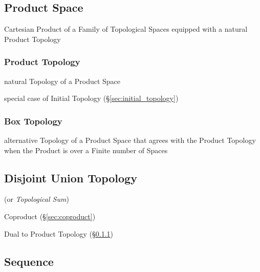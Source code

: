 \subsection{Product Space}\label{sec:product_space}

Cartesian Product of a Family of Topological Spaces equipped with a natural
Product Topology



\subsubsection{Product Topology}\label{sec:product_topology}

natural Topology of a Product Space

special case of Initial Topology (\S\ref{sec:initial_topology})



\subsubsection{Box Topology}\label{sec:box_topology}

alternative Topology of a Product Space that agrees with the Product Topology
when the Product is over a Finite number of Spaces



\subsection{Disjoint Union Topology}\label{sec:disjoint_union_topology}

(or \emph{Topological Sum})

Coproduct (\S\ref{sec:coproduct})

Dual to Product Topology (\S\ref{sec:product_topology})



\subsection{Sequence}\label{sec:sequence_topology}

